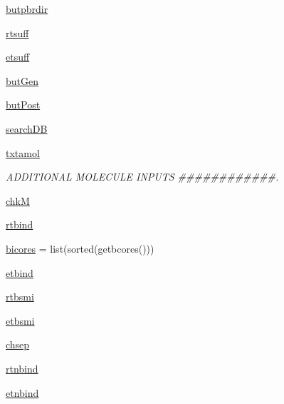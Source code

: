 \begin{DoxyCompactItemize}
\item 
\hyperlink{classmolSimplify_1_1Classes_1_1mGUI_1_1mGUI_a84be6f4cd8059640a625304ea5330231}{butpbrdir}
\item 
\hyperlink{classmolSimplify_1_1Classes_1_1mGUI_1_1mGUI_a3c8c9facdb4752204a94d3a9e2cd7d38}{rtsuff}
\item 
\hyperlink{classmolSimplify_1_1Classes_1_1mGUI_1_1mGUI_aad4b4e35bd022deea6cbd161f03d07c7}{etsuff}
\item 
\hyperlink{classmolSimplify_1_1Classes_1_1mGUI_1_1mGUI_ab79f07425971af0825d9603f832d51d2}{but\+Gen}
\item 
\hyperlink{classmolSimplify_1_1Classes_1_1mGUI_1_1mGUI_ac1c9e1cdae6ff8695e8385d63cf71bc8}{but\+Post}
\item 
\hyperlink{classmolSimplify_1_1Classes_1_1mGUI_1_1mGUI_aa285f01a77a2661d61c925cafd4c4e30}{search\+DB}
\item 
\hyperlink{classmolSimplify_1_1Classes_1_1mGUI_1_1mGUI_ad48db2ddd60ff53ed1ac966804f8290e}{txtamol}
\begin{DoxyCompactList}\small\item\em A\+D\+D\+I\+T\+I\+O\+N\+AL M\+O\+L\+E\+C\+U\+LE I\+N\+P\+U\+TS \#\#\#\#\#\#\#\#\#\#\#\#. \end{DoxyCompactList}\item 
\hyperlink{classmolSimplify_1_1Classes_1_1mGUI_1_1mGUI_a41b7754438042bc9e56aa23b34711482}{chkM}
\item 
\hyperlink{classmolSimplify_1_1Classes_1_1mGUI_1_1mGUI_aa7ce068e71697746c5adb241a856fcd0}{rtbind}
\item 
\hyperlink{classmolSimplify_1_1Classes_1_1mGUI_1_1mGUI_aa21862c44141bb7923f0fd131f49dfbf}{bicores} = list(sorted(getbcores()))
\item 
\hyperlink{classmolSimplify_1_1Classes_1_1mGUI_1_1mGUI_a32666d05a68eecba2a26618f697d8bc2}{etbind}
\item 
\hyperlink{classmolSimplify_1_1Classes_1_1mGUI_1_1mGUI_a31d37386a4482bc7ffebcbd1c26f19a8}{rtbsmi}
\item 
\hyperlink{classmolSimplify_1_1Classes_1_1mGUI_1_1mGUI_aadd80f2ae658ca67b470513f82c5e3f1}{etbsmi}
\item 
\hyperlink{classmolSimplify_1_1Classes_1_1mGUI_1_1mGUI_a2b0df37e1d9d70355d02d1f03c8eb29b}{chsep}
\item 
\hyperlink{classmolSimplify_1_1Classes_1_1mGUI_1_1mGUI_a1ba11b3353e0300fbeacb51be35fa6f0}{rtnbind}
\item 
\hyperlink{classmolSimplify_1_1Classes_1_1mGUI_1_1mGUI_a8a27c9048a0135d6dbacb289d61ffb58}{etnbind}

\end{DoxyCompactItemize}
